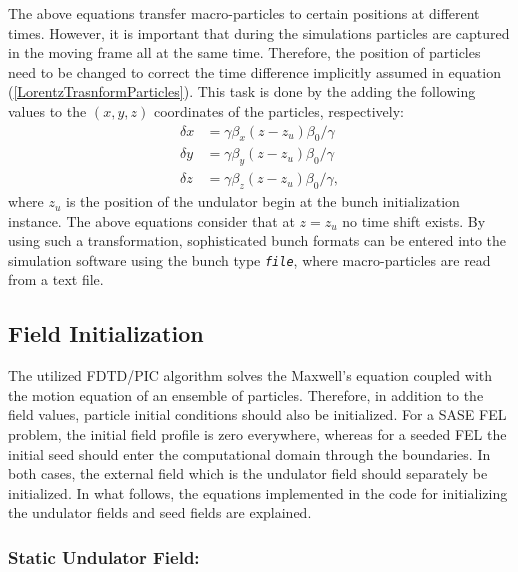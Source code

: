 The above equations transfer macro-particles to certain positions at different times.
%
However, it is important that during the simulations particles are captured in the moving frame all at the same time.
%
Therefore, the position of particles need to be changed to correct the time difference implicitly assumed in equation (\ref{LorentzTrasnformParticles}).
%
This task is done by the adding the following values to the $(x,y,z)$ coordinates of the particles, respectively:
%
\begin{align}
\delta x &= \gamma \beta_x ( z - z_u) \beta_0 / \gamma \\
\delta y &= \gamma \beta_y ( z - z_u) \beta_0 / \gamma \\
\delta z &= \gamma \beta_z ( z - z_u) \beta_0 / \gamma,
\label{LorentzTransformDeltaR}
\end{align}
%
where $z_u$ is the position of the undulator begin at the bunch initialization instance.
%
The above equations consider that at $z = z_u$ no time shift exists.
%
By using such a transformation, sophisticated bunch formats can be entered into the simulation software using the bunch type {\tt \small \em file}, where macro-particles are read from a text file.

\subsection{Field Initialization}
\label{fieldInitialization}

The utilized FDTD/PIC algorithm solves the Maxwell's equation coupled with the motion equation of an ensemble of particles.
%
Therefore, in addition to the field values, particle initial conditions should also be initialized.
%
For a SASE FEL problem, the initial field profile is zero everywhere, whereas for a seeded FEL the initial seed should enter the computational domain through the boundaries.
%
In both cases, the external field which is the undulator field should separately be initialized.
%
In what follows, the equations implemented in the code for initializing the undulator fields and seed fields are explained.

\subsubsection{Static Undulator Field:}

